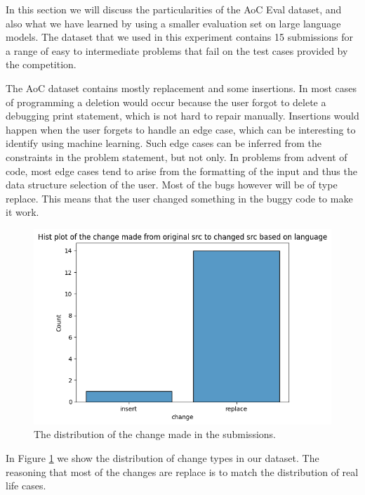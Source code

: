 \documentclass[12pt,a4paper]{report}
\begin{document}
In this section we will discuss the particularities of the AoC Eval dataset, and also what we have learned by using a smaller evaluation set on large language models. The dataset that we used in this experiment contains 15 submissions for a range of easy to intermediate problems that fail on the test cases provided by the competition.

The AoC dataset contains mostly replacement and some insertions. In most cases of programming a deletion would occur because the user forgot to delete a debugging print statement, which is not hard to repair manually. Insertions would happen when the user forgets to handle an edge case, which can be interesting to identify using machine learning. Such edge cases can be inferred from the constraints in the problem statement, but not only. In problems from advent of code, most edge cases tend to arise from the formatting of the input and thus the data structure selection of the user. Most of the bugs however will be of type replace. This means that the user changed something in the buggy code to make it work.

\begin{figure}[hp!]
\centering
\includegraphics[width=\textwidth]{pics/aoc_submissionchange.png}
  \caption{The distribution of the change made in the submissions.}
  \label{fig:aoceda1}
\end{figure}

In Figure \ref{fig:aoceda1} we show the distribution of change types in our dataset. The reasoning that most of the changes are replace is to match the distribution of real life cases.
\end{document}
